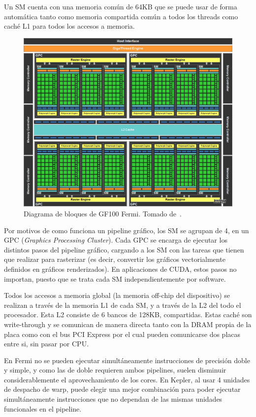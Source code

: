 Un SM cuenta con una memoria com\'un de 64KB que se puede usar de forma autom\'atica tanto como memoria
compartida com\'un a todos los threads como cach\'e L1 para todos los accesos a memoria.

\begin{figure}[htbp]
    \centering
    \includegraphics[width=\plotwidth]{images/fermi-gpu-block.png}
    \caption{Diagrama de bloques de GF100 Fermi. Tomado de~\cite{NvidiaFermi}.}
    \label{fermi_gpu_block}
\end{figure}


Por motivos de como funciona un pipeline gr\'afico, los SM se agrupan de 4, en un GPC (\textit{Graphics
Processing Cluster}). Cada GPC se encarga de ejecutar los distintos pasos del pipeline gr\'afico,
cargando a los SM con las tareas que tienen que realizar para rasterizar (es decir, convertir los
gr\'aficos vectorialmente definidos en gr\'aficos renderizados). En aplicaciones de CUDA, estos pasos
no importan, puesto que se trata cada SM independientemente por software.

Todos los accesos a memoria global (la memoria off-chip del dispositivo) se realizan a trav\'es de la memoria
L1 de cada SM, y a trav\'es de la L2 del todo el procesador. Esta L2 consiste de 6 bancos de 128KB, compartidas.
Estas cach\'e son write-through y se comunican de manera directa tanto con la DRAM propia de la placa como
con el bus PCI Express por el cual pueden comunicarse dos placas entre si, sin pasar por CPU.

En Fermi no se pueden ejecutar simult\'aneamente instrucciones de precisi\'on doble y simple, y como
las de doble requieren ambos pipelines, suelen disminuir considerablemente el aprovechamiento
de los cores. En Kepler, al usar 4 unidades de despacho de warp, puede elegir una mejor
combinaci\'on para poder ejecutar simult\'aneamente instrucciones que no dependan de las mismas
unidades funcionales en el pipeline. ~\cite{NvidiaKepler}

